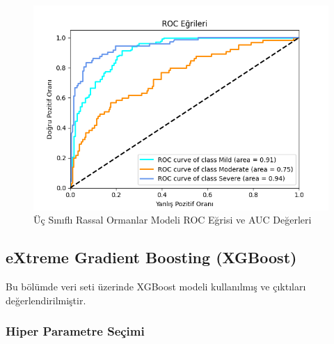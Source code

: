 \documentclass[12pt,twoside]{deuthesis}
\begin{document}
\begin{figure}

{\centering \includegraphics[width=1.05\linewidth,height=0.6\textheight]{figure/roc_curve_RandomForestClassifier} 

}

\caption{Üç Sınıflı Rassal Ormanlar Modeli ROC Eğrisi ve AUC Değerleri}\label{fig:unnamed-chunk-33}
\end{figure}
\hypertarget{mult_xgb}{%
\subsection{eXtreme Gradient Boosting (XGBoost)}\label{mult_xgb}}

Bu bölümde veri seti üzerinde XGBoost modeli kullanılmış ve çıktıları değerlendirilmiştir.

\hypertarget{hiper-parametre-seuxe7imi-2}{%
\subsubsection{Hiper Parametre Seçimi}\label{hiper-parametre-seuxe7imi-2}}
\end{document}
